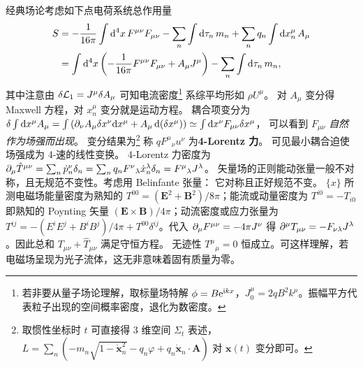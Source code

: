 经典场论考虑如下点电荷系统总作用量
\begin{align}
    S &= -\frac{1}{16\pi}\int\dd[4]{x}F^{\mu\nu} F_{\mu\nu} -\sum_n\int\dd{\tau_n} m_n+ \sum_n q_n \int\dd{x^\mu_n} A_\mu\\
    &= \int\dd[4]{x} \left(-\frac{1}{16\pi}F^{\mu\nu} F_{\mu\nu}+A_\mu J^\mu\right) - \sum_n\int\dd{\tau_n} m_n\notag,
\end{align}
其中注意由 $\delta\mathcal{L}_1=J^\mu\delta A_\mu$ 可知电流密度\footnote{若非要从量子场论理解，取标量场特解 $\phi = B\mathrm{e}^{\mathrm{i} kx}$，$J^\mu_0 = 2 q B^2 k^\mu$。振幅平方代表粒子出现的空间概率密度，退化为数密度。}
系综平均形如 $\rho U^\mu$。
对 $A_\mu$ 变分得 Maxwell 方程，对 $x^\mu_n$ 变分就是运动方程。
耦合项变分为 $\delta \int\dd x^\mu A_\mu=\int\left(\partial_\nu A_{\mu} \delta x^\nu \dd x^\mu+A_\mu \dd(\delta x^\mu)\right) \simeq \int\dd x^\nu F_{\mu \nu} \delta x^\mu$，
可以看到 $F_{\mu\nu}$ \textit{自然作为场强而出现}。
变分结果为\footnote{取惯性坐标时 $t$ 可直接得 3 维空间 $\Sigma_t$ 表述，$L=\sum_n(-m_n\sqrt{1-\dot{\bm x}_n^2}-q_n\varphi+q_n\dot{\bm x}_n\cdot\bm A)$ 对 $\bm x(t)$ 变分即可。}
称 $q F^{\mu}{}_{\nu}u^\nu$ 为\textbf{4-Lorentz 力}。 
可见最小耦合迫使场强成为 4-速的线性变换。
4-Lorentz 力密度为 $\partial_\mu\hat T^{\mu\nu} = \sum_n \dot p^\nu_n \delta_n = \sum_n q_n F^{\nu}{}_{\lambda}\dot x^\lambda_n \delta_n = F^{\mu}{}_{\lambda} J^\lambda$。
矢量场的正则能动张量一般不对称，且无规范不变性。考虑用 Belinfante 张量：
它对称且正好规范不变。
$\{x\}$ 所测电磁场能量密度为熟知的 $T^{00}=(\bm E^2+\bm B^2)/8\pi$；能流或动量密度为 $T^{i0}=-T_{i0}$ 即熟知的 Poynting 矢量 $(\bm E\times \bm B) / 4\pi$；动流密度或应力张量为 $T^{ij}=-(E^i E^j+B^i B^j)/4\pi+T^{00}\delta^{ij}$。代入 $\partial_\mu F^{\mu\nu}=-4 \pi J^\nu$ 得
$\partial^\mu T_{\mu\nu}=-F_{\nu\lambda}J^\lambda$。因此总和 $T_{\mu\nu} + \hat T_{\mu\nu}$ 满足守恒方程。
无迹性 $T^\mu{}_\mu=0$ 恒成立。可这样理解，若电磁场呈现为光子流体，这无非意味着固有质量为零。


